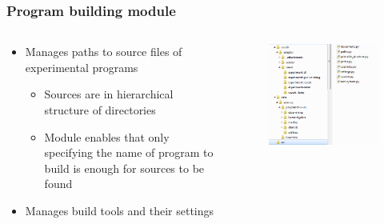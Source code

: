 \documentclass{beamer}
\begin{document}
\begin{frame}
\frametitle{Program building module}

	\begin{columns}[T]
		\begin{column}{0.5\textwidth}
			\begin{itemize}
				\item Manages paths to source files of experimental programs
				\begin{itemize}
					\item Sources are in hierarchical structure of directories
					\item Module enables that only specifying the name of program to build is enough for sources to be found
				\end{itemize}
				\item Manages build tools and their settings
			\end{itemize}
		\end{column}
		\begin{column}{0.5\textwidth}
			\begin{figure}
				\includegraphics[width=\textwidth]{source-tree}
			\end{figure}
		\end{column}
	\end{columns}
	
\end{frame}
\end{document}
